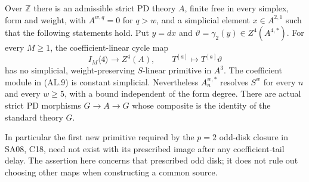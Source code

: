 \begin{theorem}
\label{AL03}
Over $\mathbb Z$ there is an admissible strict PD theory $A$,
finite free in every simplex, form and weight, with
$A^{w,q}=0$ for $q>w$, and a simplicial element
$x\in A^{2,1}$ such that the following statements hold.
Put $y=dx$ and $\vartheta=\gamma_2(y)\in Z^4(A^{4,*})$.
For every $M\geq1$, the coefficient-linear cycle map
\[
 I_M\langle4\rangle\longrightarrow Z^4(A),\qquad
 T^{[a]}\longmapsto T^{[a]}\vartheta
 \tag{AL.9}
\]
has no simplicial, weight-preserving $S$-linear primitive in $A^3$.
The coefficient module in \textup{(AL.9)} is constant simplicial.
Nevertheless $A_n^{w,*}$ resolves $S^w$ for every $n$ and every
$w\geq5$, with a bound independent of the form degree.
There are actual strict PD morphisms $G\to A\to G$ whose
composite is the identity of the standard theory $G$.

In particular the first new primitive required by the
$p=2$ odd-disk closure in SA08, C18, need not exist with its
prescribed image after any coefficient-tail delay.  The
assertion here concerns that prescribed odd disk; it does
not rule out choosing other maps when constructing a common
source.
\end{theorem}

